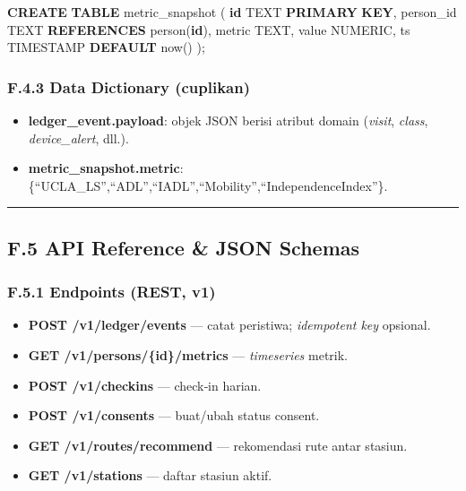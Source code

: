 \documentclass[
  letterpaper,
  DIV=11,
  numbers=noendperiod]{scrartcl}
\newenvironment{Shaded}{\begin{snugshade}}{\end{snugshade}}
\newcommand{\DataTypeTok}[1]{\textcolor[rgb]{0.68,0.00,0.00}{#1}}
\newcommand{\FunctionTok}[1]{\textcolor[rgb]{0.28,0.35,0.67}{#1}}
\newcommand{\KeywordTok}[1]{\textcolor[rgb]{0.00,0.23,0.31}{\textbf{#1}}}
\newcommand{\NormalTok}[1]{\textcolor[rgb]{0.00,0.23,0.31}{#1}}
\providecommand{\tightlist}{%
  \setlength{\itemsep}{0pt}\setlength{\parskip}{0pt}}
\begin{document}
\begin{Shaded}
\begin{Highlighting}[]
\KeywordTok{CREATE} \KeywordTok{TABLE}\NormalTok{ metric\_snapshot (}
  \KeywordTok{id}\NormalTok{ TEXT }\KeywordTok{PRIMARY} \KeywordTok{KEY}\NormalTok{,}
\NormalTok{  person\_id TEXT }\KeywordTok{REFERENCES}\NormalTok{ person(}\KeywordTok{id}\NormalTok{),}
\NormalTok{  metric TEXT,}
  \FunctionTok{value} \DataTypeTok{NUMERIC}\NormalTok{,}
\NormalTok{  ts }\DataTypeTok{TIMESTAMP} \KeywordTok{DEFAULT}\NormalTok{ now()}
\NormalTok{);}
\end{Highlighting}
\end{Shaded}

\subsubsection{F.4.3 Data Dictionary
(cuplikan)}\label{f.4.3-data-dictionary-cuplikan}

\begin{itemize}
\tightlist
\item
  \textbf{ledger\_event.payload}: objek JSON berisi atribut domain
  (\emph{visit}, \emph{class}, \emph{device\_alert}, dll.).
\item
  \textbf{metric\_snapshot.metric}:
  \{``UCLA\_LS'',``ADL'',``IADL'',``Mobility'',``IndependenceIndex''\}.
\end{itemize}

\begin{center}\rule{0.5\linewidth}{0.5pt}\end{center}

\subsection{F.5 API Reference \& JSON
Schemas}\label{f.5-api-reference-json-schemas}

\subsubsection{F.5.1 Endpoints (REST,
v1)}\label{f.5.1-endpoints-rest-v1}

\begin{itemize}
\tightlist
\item
  \textbf{POST /v1/ledger/events} --- catat peristiwa; \emph{idempotent
  key} opsional.
\item
  \textbf{GET /v1/persons/\{id\}/metrics} --- \emph{timeseries} metrik.
\item
  \textbf{POST /v1/checkins} --- check‑in harian.
\item
  \textbf{POST /v1/consents} --- buat/ubah status consent.
\item
  \textbf{GET /v1/routes/recommend} --- rekomendasi rute antar stasiun.
\item
  \textbf{GET /v1/stations} --- daftar stasiun aktif.
\end{itemize}
\end{document}
